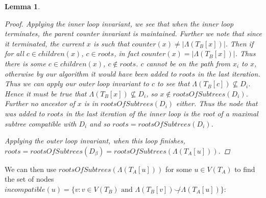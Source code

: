 \documentclass{article}
\newcommand{\compatible}{\smile}
\newcommand{\leafset}{\Lambda}
\newtheorem{computerootsofsubtreescorrectness}[incompatibility]{Lemma}
\begin{document}
\begin{computerootsofsubtreescorrectness}
\begin{proof}
            Applying the inner loop invariant, we see that when the inner loop terminates, the parent counter invariant is maintained. Further we note that since it terminated, the current $x$ is such that $counter(x) \neq |\leafset(T_B[x])|$. Then if for all $c \in children(x)$, $c \in roots$, in fact $counter(x) = |\leafset(T_B[x])|$. Thus there is some $c \in children(x)$, $c \not\in roots$. $c$ cannot be on the path from $x_i$ to $x$, otherwise by our algorithm it would have been added to $roots$ in the last iteration. Thus we can apply our outer loop invariant to $c$ to see that $\leafset(T_B[c]) \not\subseteq D_i$. Hence it must be true that $\leafset(T_B[x]) \not\subseteq D_i$, so $x \not\in rootsOfSubtrees(D_i)$. Further no ancestor of $x$ is in $rootsOfSubtrees(D_i)$ either. Thus the node that was added to $roots$ in the last iteration of the inner loop is the root of a maximal subtree compatible with $D_i$ and so $roots = rootsOfSubtrees(D_i)$.

            Applying the outer loop invariant, when this loop finishes, $roots = rootsOfSubtrees(D_{\beta}) = rootsOfSubtrees(\leafset(T_A[u]))$.
        \end{proof}
    \end{computerootsofsubtreescorrectness}

    We can then use $rootsOfSubtrees(\leafset(T_A[u]))$ for some $u \in V(T_A)$ to find the set of nodes $incompatible(u) = \{v : v \in V(T_B) \text{ and } \leafset(T_B[v]) \not\compatible \leafset(T_A[u])\}$:
\end{document}
